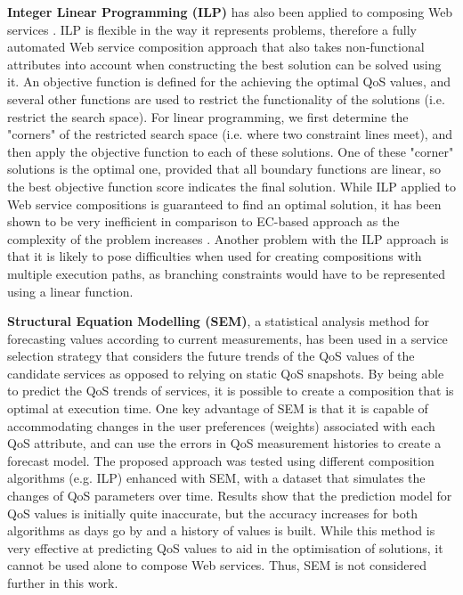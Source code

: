 \textbf{Integer Linear Programming (ILP)} has also been applied to composing Web services \cite{yoo2008web}. ILP is flexible in the way it represents problems, therefore a fully automated Web service composition approach that also takes non-functional attributes into account when constructing the best solution can be solved using it. An objective function is defined for the achieving the optimal QoS values, and several other functions are used to restrict the functionality of the solutions (i.e. restrict the search space). For linear programming, we first determine the "corners" of the restricted search space (i.e. where two constraint lines meet), and then apply the objective function to each of these solutions. One of these "corner" solutions is the optimal one, provided that all boundary functions are linear, so the best objective function score indicates the final solution. While ILP applied to Web service compositions is guaranteed to find an optimal solution, it has been shown to be very inefficient in comparison to EC-based approach as the complexity of the problem increases \cite{aversano2006genetic}. Another problem with the ILP approach is that it is likely to pose difficulties when used for creating compositions with multiple execution paths, as branching constraints would have to be represented using a linear function.

\textbf{Structural Equation Modelling (SEM)}, a statistical analysis method for forecasting values according to current measurements, has been used in a service selection strategy that considers the future trends of the QoS values of the candidate services \cite{DBLP:journals/soca/LiZDSGL13} as opposed to relying on static QoS snapshots. By being able to predict the QoS trends of services, it is possible to create a composition that is optimal at execution time. One key advantage of SEM is that it is capable of accommodating changes in the user preferences (weights) associated with each QoS attribute, and can use the errors in QoS measurement histories to create a forecast model. The proposed approach was tested using different composition algorithms (e.g. ILP) enhanced with SEM, with a dataset that simulates the changes of QoS parameters over time. Results show that the prediction model for QoS values is initially quite inaccurate, but the accuracy increases for both algorithms as days go by and a history of values is built. While this method is very effective at predicting QoS values to aid in the optimisation of solutions, it cannot be used alone to compose Web services. Thus, SEM is not considered further in this work.


